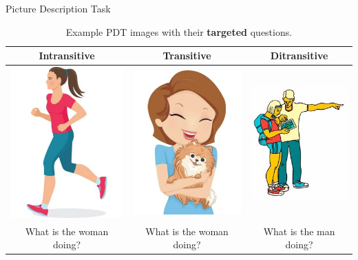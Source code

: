 \documentclass[final,t]{beamer}
\begin{document}
\begin{frame}{}
\begin{columns}[t]
\begin{column}{.33\linewidth}
\begin{block}{Picture Description Task}
\begin{center}
\begin{minipage}{.85\textwidth}
	\bigskip
\setlength{\fboxsep}{3pt}
\setlength{\fboxrule}{0pt}
\begin{table}[htb!]
\begin{center}
\begin{tabular}{|c|c|c|}
\hline
Intransitive & Transitive & Ditransitive \\
\hline
{\includegraphics[width=0.29\columnwidth]{../figures/I30.jpg}} & {\includegraphics[width=0.3\columnwidth]{../figures/I29.jpg}} & {\includegraphics[width=0.3\columnwidth]{../figures/I28.jpg}} \\
What is the woman doing? & What is the woman doing? & What is the man doing? \\
\hline
\end{tabular}
\medskip
\caption{\label{tab:example-pdt-items} Example PDT images with their \textbf{targeted} questions.} %
\end{center}
\end{table}


\end{minipage}
\end{center}
\end{block}
\end{column}
\end{columns}
\end{frame}
\end{document}
